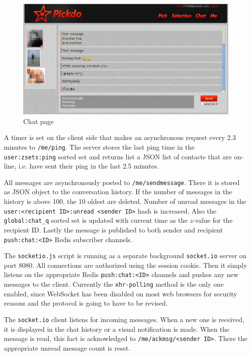\documentclass[12pt,oneside]{fithesis}
\begin{document}
		\label{section:chat}
		\begin{figure}[h]
	  \centering
	    \includegraphics[width=1.0\textwidth]{screen-chat.png}
		  \caption{Chat page}
		  \label{fig:screen-chat}
	  \end{figure}
	  
	  A timer is set on the client side that makes an asynchronous request every 2.3 minutes to \texttt{/me/ping}. The server stores the last ping time in the \texttt{user:zsets:ping} sorted set and returns list a JSON list of contacts that are on-line, i.e. have sent their ping in the last 2.5 minutes.
	  
	  All messages are asynchronously posted to \texttt{/me/sendmessage}. There it is stored as JSON object to the conversation history. If the number of messages in the history is above 100, the 10 oldest are deleted. Number of unread messages in the \texttt{user:<recipient ID>:unread <sender ID>} hash is increased. Also the \texttt{global:chat\_q} sorted set is updated with current time as the $z$-value for the recipient ID. Lastly the message is published to both sender and recipient \texttt{push:chat:<ID>} Redis subscriber channels.
	  
	  The \texttt{socketio.js} script is running as a separate background \texttt{socket.io} server on port 8080. All connections are authorized using the session cookie. Then it simply listens on the appropriate Redis \texttt{push:chat:<ID>} channels and pushes any new messages to the client. Currently the \texttt{xhr-polling} method is the only one enabled, since WebSocket has been disabled on most web browsers for security reasons and the protocol is going to have to be revised.
	  
	  The \texttt{socket.io} client listens for incoming messages. When a new one is received, it is displayed in the chat history or a visual notification is made. When the message is read, this fact is acknowledged to \texttt{/me/ackmsg/<sender ID>}. There the appropriate unread message count is reset.
	  
\end{document}
